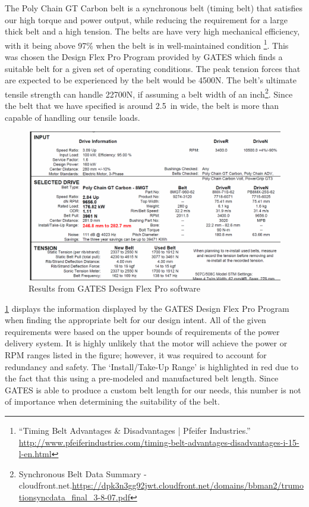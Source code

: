 \documentclass[main.tex]{subfiles}
\begin{document}
	The Poly Chain GT Carbon belt is a synchronous belt (timing belt) that satisfies our high torque and power output, while reducing the requirement for a large thick belt and a high tension. The belts are have very high mechanical efficiency, with it being above 97\% when the belt is in well-maintained condition \footnote{``Timing Belt Advantages \& Disadvantages | Pfeifer Industries.'' \url{http://www.pfeiferindustries.com/timing-belt-advantages-disadvantages-i-15-l-en.html}}. This was chosen the Design Flex Pro Program provided by GATES which finds a suitable belt for a given set of operating conditions. The peak tension forces that are expected to be experienced by the belt would be 4500N. The belt’s ultimate tensile strength can handle 22700N, if assuming a belt width of an inch\footnote{Synchronous Belt Data Summary -cloudfront.net.\url{https://dpk3n3gg92jwt.cloudfront.net/domains/bbman2/trumotionsyncdata_final_3-8-07.pdf}}. Since the belt that we have specified is around \SI{2.5}{in} wide, the belt is more than capable of handling our tensile loads.\\

  \begin{figure}
    \centering
    \includegraphics[width=0.75\linewidth]{images/gates.png}
    \caption{Results from GATES Design Flex Pro software}
    \label{fig:gates}
\end{figure}

\ref{fig:gates} displays the information displayed by the GATES Design Flex Pro Program when finding the appropriate belt for our design intent. All of the given requirements were based on the upper bounds of requirements of the power delivery system. It is highly unlikely that the motor will achieve the power or RPM ranges listed in the figure; however, it was required to account for redundancy and safety. The ‘Install/Take-Up Range’ is highlighted in red due to the fact that this using a pre-modeled and manufactured belt length. Since GATES is able to produce a custom belt length for our needs, this number is not of importance when determining the suitability of the belt.
\end{document}
